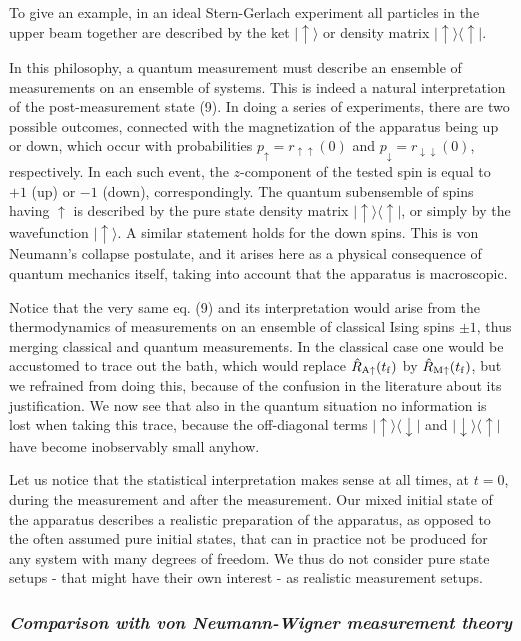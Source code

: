 \documentclass[12pt, onecolumn, aps,prb,floatfix]{revtex4-2}
\newcommand{\RA}{{\rm A}}
\newcommand{\RM}{{\rm M}}
\newcommand{\down}{{\downarrow}}
\newcommand{\up}{{\uparrow}}
\newcommand{\uu}{{\uparrow\uparrow}}
\newcommand{\dd}{{\downarrow\downarrow}}
\newcommand{\tf}{t_{\rm f}}
\begin{document}
To give an example, in an ideal Stern-Gerlach experiment all particles in the upper
beam together are described by the ket $|\up\rangle$ or density matrix
$|\up\rangle\langle\up|$.

In this philosophy, a quantum measurement must describe  an ensemble of 
measurements on an ensemble of systems. 
This is indeed a natural interpretation of the post-measurement state (9).
 In doing a series of experiments, there are two possible
outcomes, connected with the magnetization of the apparatus being up or down,
which occur with probabilities $p_\up=r_\uu(0)$ and $p_\down=r_\dd(0)$, respectively.
In each such event, the $z$-component of the tested spin is 
equal to $+1$ (up) or $-1$ (down), correspondingly. 
The quantum subensemble of spins having $\up$ is described by
the pure state density matrix $|\up\rangle\langle \up|$, or simply
by the wavefunction $|\up\rangle$. A similar statement holds for the
down spins. This is von Neumann's  collapse postulate, and it arises 
here as a physical consequence of  quantum mechanics itself, 
taking into account that the apparatus is macroscopic.

Notice that the very same eq. (9) and its interpretation would arise from
the thermodynamics of measurements on an ensemble of classical Ising spins $\pm 1$,
thus merging classical and quantum measurements.
In the classical case one would be accustomed to trace out the bath, 
which would replace $\hat R_{\RA\up}(\tf)$ by $\hat R_{\RM\up}(\tf)$,
but we refrained from doing this, because of the confusion 
in the literature about its justification. 
We now see that also in the quantum situation
no information is lost when taking this trace,
because the off-diagonal terms $|\up\rangle\langle\down|$ and
$|\down\rangle\langle\up|$ have become inobservably small  anyhow. 

Let us notice that the statistical interpretation makes sense at all times,
at $t=0$, during the measurement and after the measurement.
Our mixed initial state of the apparatus describes a realistic preparation
of the apparatus, as opposed to the often assumed pure initial states, that
can in practice not be produced for any system with many degrees of freedom.
We thus do not consider pure state setups - that might have their own interest - 
as realistic measurement setups.

\subsubsection*{\it Comparison with von Neumann-Wigner measurement theory}
\end{document}
